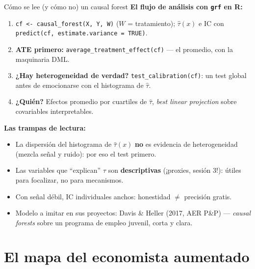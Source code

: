 \documentclass{beamer}
\newcommand{\1}{\mathbb{I}}
\begin{document}
\begin{frame}{Cómo se lee (y cómo no) un causal forest}
\small
\textbf{El flujo de análisis con \texttt{grf} en R:}
\begin{enumerate}\itemsep3pt
  \item \texttt{cf <- causal\_forest(X, Y, W)} \quad ($W$ = tratamiento); $\hat{\tau}(x)$ e IC con \texttt{predict(cf, estimate.variance = TRUE)}.
  \item \textbf{ATE primero:} \texttt{average\_treatment\_effect(cf)} --- el promedio, con la maquinaria DML.
  \item \textbf{¿Hay heterogeneidad de verdad?} \texttt{test\_calibration(cf)}: un test global antes de emocionarse con el histograma de $\hat{\tau}$.
  \item \textbf{¿Quién?} Efectos promedio por cuartiles de $\hat{\tau}$, \emph{best linear projection} sobre covariables interpretables.
\end{enumerate}
\pause

\vspace{0.15cm}
\textbf{Las trampas de lectura:}
\begin{itemize}\itemsep4pt
  \item La dispersión del histograma de $\hat{\tau}(x)$ \textbf{no} es evidencia de heterogeneidad (mezcla señal y ruido): por eso el test primero.
  \item Las variables que ``explican'' $\tau$ son \textbf{descriptivas} (¡proxies, sesión 3!): útiles para focalizar, no para mecanismos.
  \item Con señal débil, IC individuales anchos: honestidad $\neq$ precisión gratis.
  \item Modelo a imitar en sus proyectos: Davis \& Heller (2017, AER P\&P) --- \emph{causal forests} sobre un programa de empleo juvenil, corta y clara.
\end{itemize}
\end{frame}


\section{El mapa del economista aumentado}
\begin{frame}[noframenumbering]
\tableofcontents[currentsection]
\end{frame}
\end{document}
